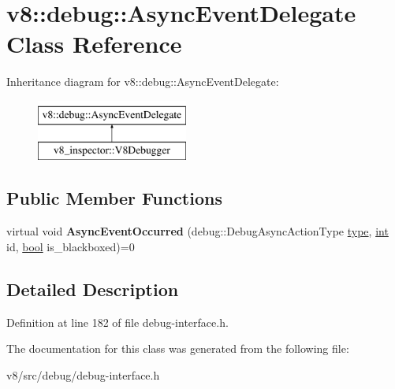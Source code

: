 \hypertarget{classv8_1_1debug_1_1AsyncEventDelegate}{}\section{v8\+:\+:debug\+:\+:Async\+Event\+Delegate Class Reference}
\label{classv8_1_1debug_1_1AsyncEventDelegate}
Inheritance diagram for v8\+:\+:debug\+:\+:Async\+Event\+Delegate\+:\begin{figure}[H]
\begin{center}
\leavevmode
\includegraphics[height=2.000000cm]{classv8_1_1debug_1_1AsyncEventDelegate}
\end{center}
\end{figure}
\subsection*{Public Member Functions}
\begin{DoxyCompactItemize}
\item 
\mbox{\label{classv8_1_1debug_1_1AsyncEventDelegate_a2203c9c7551d4e6fa2b810ca379b8de6}} 
virtual void {\bfseries Async\+Event\+Occurred} (debug\+::\+Debug\+Async\+Action\+Type \mbox{\hyperlink{classstd_1_1conditional_1_1type}{type}}, \mbox{\hyperlink{classint}{int}} id, \mbox{\hyperlink{classbool}{bool}} is\+\_\+blackboxed)=0
\end{DoxyCompactItemize}


\subsection{Detailed Description}


Definition at line 182 of file debug-\/interface.\+h.



The documentation for this class was generated from the following file\+:\begin{DoxyCompactItemize}
\item 
v8/src/debug/debug-\/interface.\+h\end{DoxyCompactItemize}
